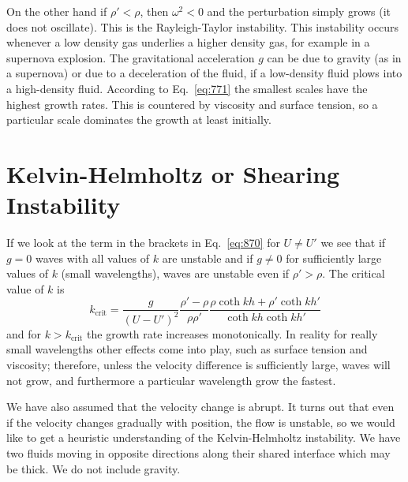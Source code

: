 On the other hand if $\rho' < \rho$, then $\omega^2 < 0$ and the
perturbation simply grows (it does not oscillate).  This is the
Rayleigh-Taylor instability.  This instability occurs whenever a low
density gas underlies a higher density gas, for example in a supernova
explosion.  The gravitational acceleration $g$ can be due to gravity
(as in a supernova) or due to a deceleration of the fluid, if a
low-density fluid plows into a high-density fluid.  According to
Eq.~\ref{eq:771} the smallest scales have the highest growth rates.
This is countered by viscosity and surface tension, so a
particular scale dominates the growth at least initially.

\section{Kelvin-Helmholtz or Shearing Instability}
\label{sec:kelvin-helmholtz-or}

If we look at the term in the brackets in Eq.~\ref{eq:870} for $U \neq
U'$ we see that if $g=0$ waves with all values of $k$ are unstable and if $g\neq
0$ for sufficiently large values of $k$ (small wavelengths), waves are
unstable even if $\rho'>\rho$.  The critical value of $k$ is
\begin{equation}
k_\mathrm{crit} = \frac{g}{\left (U - U'\right)^2} \frac{\rho'-\rho}{\rho \rho' } \frac{\rho
  \coth kh + \rho' \coth k h'}{\coth kh \coth k h'}
\end{equation}
and for $k>k_\mathrm{crit}$ the growth rate increases monotonically.
In reality for really small wavelengths other effects come into play,
such as surface tension and viscosity; therefore, unless the velocity
difference is sufficiently large, waves will not grow, and furthermore
a particular wavelength grow the fastest.

We have also assumed that the velocity change is abrupt.  It turns out
that even if the velocity changes gradually with position, the flow is
unstable, so we would like to get a heuristic understanding of the
Kelvin-Helmholtz instability.  We have two fluids moving in opposite
directions along their shared interface which may be thick.  We do not
include gravity.

